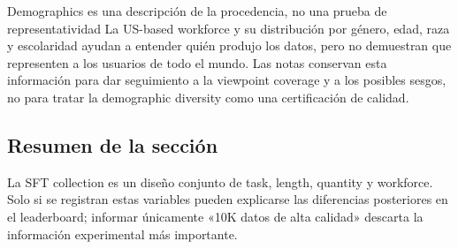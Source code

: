 
\begin{warningbox}{Demographics es una descripción de la procedencia, no una prueba de representatividad}
La US-based workforce y su distribución por género, edad, raza y escolaridad ayudan a entender quién produjo los datos, pero no demuestran que representen a los usuarios de todo el mundo. Las notas conservan esta información para dar seguimiento a la viewpoint coverage y a los posibles sesgos, no para tratar la demographic diversity como una certificación de calidad.
\end{warningbox}


\subsection{Resumen de la sección}

La SFT collection es un diseño conjunto de task, length, quantity y workforce. Solo si se registran estas variables pueden explicarse las diferencias posteriores en el leaderboard; informar únicamente «10K datos de alta calidad» descarta la información experimental más importante.

